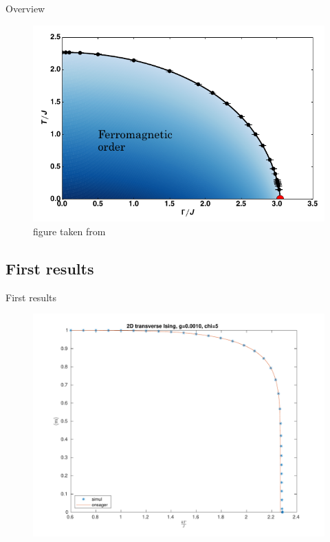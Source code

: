 \documentclass[aspectratio=169]{beamer}
\begin{document}
\begin{frame}{Overview}
    \begin{figure}
        \includegraphics[scale=0.5]{Figures/2disingphase.png}
        \caption{figure taken from \cite{PhysRevB.93.155157}}
    \end{figure}
\end{frame}


\subsection{First results}
\begin{frame}{First results}
    \begin{figure}
        \includegraphics[scale=0.4]{Figures/g00.pdf}
    \end{figure}
\end{frame}
\end{document}
